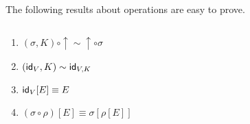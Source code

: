 \begin{code}
\\
\>[0]\<[2]%
\>[2]  \AgdaSymbol{:}  \AgdaSymbol{\{}\AgdaSymbol{\}} \AgdaSymbol{\{}\AgdaSymbol{\}} \AgdaSymbol{\{}\AgdaSymbol{\}} \AgdaSymbol{\{} \AgdaSymbol{:}   \AgdaSymbol{\}} \AgdaSymbol{\{}  \AgdaSymbol{:}   \AgdaSymbol{\}} \<%
\\
\>[2]\<[23]%
\>[23]          \<%
\end{code}

The following results about operations are easy to prove.
\begin{lemma}$ $
  \begin{enumerate}
  \item $(\sigma , K) \circ \uparrow \sim \uparrow \circ \sigma$
  \item $(\mathsf{id}_{V} , K) \sim \mathsf{id}_{V,K}$
  \item $\mathsf{id}_{V}[E] \equiv E$
  \item $(\sigma \circ \rho)[E] \equiv \sigma[\rho[E]]$
  \end{enumerate}
\end{lemma}

\begin{code}%
\>[0]\<[2]%
\>[2] \AgdaSymbol{:}  \AgdaSymbol{\{}\AgdaSymbol{\}} \AgdaSymbol{\{}\AgdaSymbol{\}} \AgdaSymbol{\{}\AgdaSymbol{\}} \AgdaSymbol{\{}\AgdaSymbol{\}} \AgdaSymbol{\{}\AgdaSymbol{\}}\<%
\\
\>[2]\<[4]%
\>[4]\AgdaSymbol{\{} \AgdaSymbol{:}   \AgdaSymbol{\}} \AgdaSymbol{(} \AgdaSymbol{:}    \AgdaSymbol{)} \<%
\\
\>[2]\<[4]%
\>[4] \AgdaSymbol{(}  \AgdaSymbol{)} \AgdaSymbol{(}  \AgdaSymbol{)}    \AgdaSymbol{(}  \AgdaSymbol{)}\<%
\end{code}

